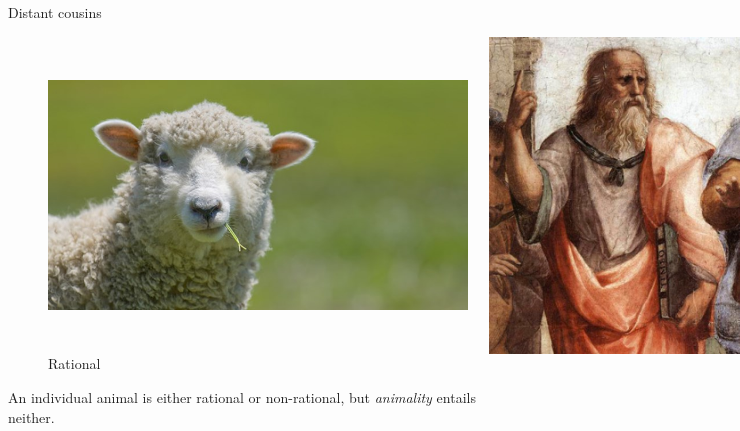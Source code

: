 \documentclass[xcolor=dvipsnames]{beamer}
\begin{document}
\begin{frame}{Distant cousins}
\begin{figure}
  \centering
  \begin{columns}
    \centering
    \caption {Non-rational}
    \includegraphics[width=0.99\textwidth]{sheep}
    \centering
    \caption {Rational}
    \includegraphics[width=0.6\textwidth]{plato}
  \end{columns}
\end{figure}
An individual animal is either rational or non-rational, but \emph{animality} entails neither.
\end{frame}
\end{document}

